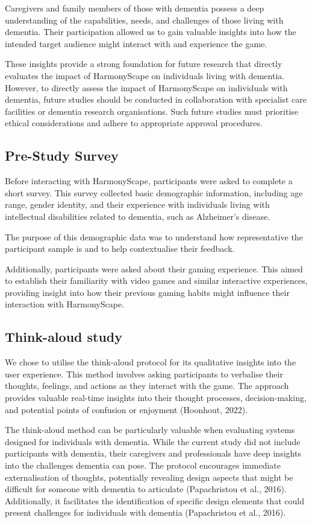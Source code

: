 \documentclass{l4proj}
\begin{document}
Caregivers and family members of those with dementia possess a deep understanding of the capabilities, needs, and challenges of those living with dementia. Their participation allowed us to gain valuable insights into how the intended target audience might interact with and experience the game.

These insights provide a strong foundation for future research that directly evaluates the impact of HarmonyScape on individuals living with dementia. However, to directly assess the impact of HarmonyScape on individuals with dementia, future studies should be conducted in collaboration with specialist care facilities or dementia research organisations. Such future studies must prioritise ethical considerations and adhere to appropriate approval procedures.

\subsection{Pre-Study Survey}
Before interacting with HarmonyScape, participants were asked to complete a short survey. This survey collected basic demographic information, including age range, gender identity, and their experience with individuals living with intellectual disabilities related to dementia, such as Alzheimer's disease.

The purpose of this demographic data was to understand how representative the participant sample is and to help contextualise their feedback.

Additionally, participants were asked about their gaming experience. This aimed to establish their familiarity with video games and similar interactive experiences, providing insight into how their previous gaming habits might influence their interaction with HarmonyScape.

\subsection{Think-aloud study}
We chose to utilise the think-aloud protocol for its qualitative insights into the user experience. This method involves asking participants to verbalise their thoughts, feelings, and actions as they interact with the game. The approach provides valuable real-time insights into their thought processes, decision-making, and potential points of confusion or enjoyment (Hoonhout, 2022).

The think-aloud method can be particularly valuable when evaluating systems designed for individuals with dementia.  While the current study did not include participants with dementia, their caregivers and professionals have deep insights into the challenges dementia can pose.  The protocol encourages immediate externalisation of thoughts, potentially revealing design aspects that might be difficult for someone with dementia to articulate (Papachristou et al., 2016). Additionally, it facilitates the identification of specific design elements that could present challenges for individuals with dementia (Papachristou et al., 2016).
\end{document}
